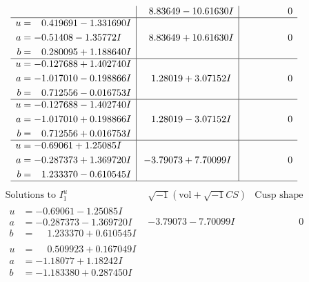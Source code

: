 \documentclass[1p]{elsarticle_modified}
\theoremstyle{definition}
\newcommand{\I}{\sqrt{-1}}
\begin{document}
$$\begin{array}{c|c|c}
 & \phantom{-}8.83649 - 10.61630 I & \phantom{-0.000000 } 0 \\ \hline\begin{aligned}
u &= \phantom{-}0.419691 - 1.331690 I \\
a &= -0.51408 - 1.35772 I \\
b &= \phantom{-}0.280095 + 1.188640 I\end{aligned}
 & \phantom{-}8.83649 + 10.61630 I & \phantom{-0.000000 } 0 \\ \hline\begin{aligned}
u &= -0.127688 + 1.402740 I \\
a &= -1.017010 - 0.198866 I \\
b &= \phantom{-}0.712556 - 0.016753 I\end{aligned}
 & \phantom{-}1.28019 + 3.07152 I & \phantom{-0.000000 } 0 \\ \hline\begin{aligned}
u &= -0.127688 - 1.402740 I \\
a &= -1.017010 + 0.198866 I \\
b &= \phantom{-}0.712556 + 0.016753 I\end{aligned}
 & \phantom{-}1.28019 - 3.07152 I & \phantom{-0.000000 } 0 \\ \hline\begin{aligned}
u &= -0.69061 + 1.25085 I \\
a &= -0.287373 + 1.369720 I \\
b &= \phantom{-}1.233370 - 0.610545 I\end{aligned}
 & -3.79073 + 7.70099 I & \phantom{-0.000000 } 0\\
 \hline 
 \end{array}$$\newpage$$\begin{array}{c|c|c}  
\text{Solutions to }I^u_{1}& \I (\text{vol} + \sqrt{-1}CS) & \text{Cusp shape}\\
 \hline 
\begin{aligned}
u &= -0.69061 - 1.25085 I \\
a &= -0.287373 - 1.369720 I \\
b &= \phantom{-}1.233370 + 0.610545 I\end{aligned}
 & -3.79073 - 7.70099 I & \phantom{-0.000000 } 0 \\ \hline\begin{aligned}
u &= \phantom{-}0.509923 + 0.167049 I \\
a &= -1.18077 + 1.18242 I \\
b &= -1.183380 + 0.287450 I\end{aligned}

\end{array}$$
\end{document}
